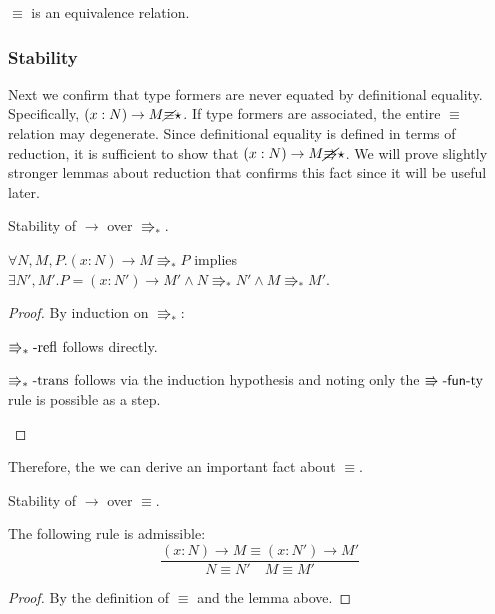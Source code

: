 \begin{fact} $\equiv$ is an equivalence relation.
\end{fact}
 
\subsubsection{Stability}
Next we confirm that type formers are never equated by definitional equality.
Specifically, $\left(x:N\right)\rightarrow M\cancel{\equiv}\star$.
If type formers are associated, the entire $\equiv$ relation may degenerate. %
Since definitional equality is defined in terms of reduction, it is sufficient to show that $\left(x:N\right)\rightarrow M\cancel{\Rrightarrow}\star$.
We will prove slightly stronger lemmas about reduction that confirms this fact since it will be useful later.
 
\begin{lem} Stability of $\rightarrow$ over $\Rrightarrow_{\ast}$.
\label{lem:pi-stability}

$\forall N,M,P.\left(x:N\right)\rightarrow M\Rrightarrow_{\ast}P$ implies $\exists N',M'.P=\left(x:N'\right)\rightarrow M'\land N\Rrightarrow_{\ast}N'\land M\Rrightarrow_{\ast}M'$.
\end{lem}
\begin{proof}
By induction on $\Rrightarrow_{\ast}$:
\begin{casenv}
 \item $\operatorname{\Rrightarrow_{\ast}-refl}$ follows directly.
 \item $\operatorname{\Rrightarrow_{\ast}-trans}$ follows via the induction hypothesis and noting only the $\operatorname{\Rrightarrow-\mathsf{fun}-ty}$ rule is possible as a step.
\end{casenv}
\end{proof}

Therefore, the we can derive an important fact about $\equiv$.

\begin{cor} Stability of $\rightarrow$ over $\equiv$.

The following rule is admissible:
\[
\frac{\left(x:N\right)\rightarrow M\equiv\left(x:N'\right)\rightarrow M'}{N\equiv N'\quad M\equiv M'}
\]
\end{cor}
\begin{proof}
By the definition of $\equiv$ and the lemma above.
\end{proof}
 
